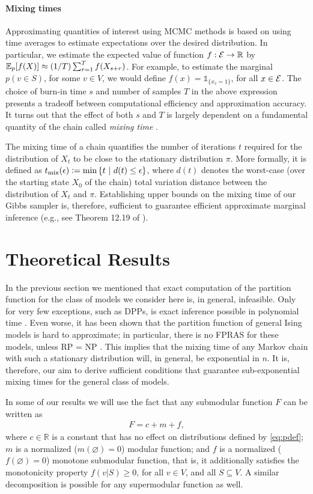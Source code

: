 \paragraph{Mixing times}
Approximating quantities of interest using MCMC methods is based on using time averages to estimate expectations over the desired distribution.
In particular, we estimate the expected value of function $f : \ss \to \mathbb{R}$ by $\E_p[f(X)] \approx (1/T)\sum_{r=1}^{T} f(X_{s + r})$.
For example, to estimate the marginal $p(v \in S)$, for some $v \in V$, we would define $f(x) = \mathds{1}_{\{x_v = 1\}}$, for all $x \in \ss$.
The choice of burn-in time $s$ and number of samples $T$ in the above expression presents a tradeoff between computational efficiency and approximation accuracy.
It turns out that the effect of both $s$ and $T$ is largely dependent on a fundamental quantity of the chain called \emph{mixing time} \cite{levin08}.

The mixing time of a chain quantifies the number of iterations $t$ required for the distribution of $X_t$ to be close to the stationary distribution $\pi$.
More formally, it is defined as $\tme \defeq \min \sdef{t}{d(t) \leq \epsilon}$, where $d(t)$ denotes the worst-case (over the starting state $X_0$ of the chain) total variation distance between the distribution of $X_t$ and $\pi$.
Establishing upper bounds on the mixing time of our Gibbs sampler is, therefore, sufficient to guarantee efficient approximate marginal inference (e.g., see Theorem 12.19 of \citet{levin08}).

\section{Theoretical Results}
In the previous section we mentioned that exact computation of the partition function for the class of models we consider here is, in general, infeasible.
Only for very few exceptions, such as DPPs, is exact inference possible in polynomial time \cite{kulesza12}.
Even worse, it has been shown that the partition function of general Ising models is hard to approximate; in particular, there is no FPRAS for these models, unless RP = NP \cite{jerrum93}.
This implies that the mixing time of any Markov chain with such a stationary distribution will, in general, be exponential in $n$.
It is, therefore, our aim to derive sufficient conditions that guarantee sub-exponential mixing times for the general class of models.

In some of our results we will use the fact that any submodular function $F$ can be written as
\begin{align} \label{eq:decomp}
  F = c + m + f,
\end{align}
where $c \in \mathbb{R}$ is a constant that has no effect on distributions defined by \eqref{eq:pdef}; $m$ is a normalized ($m(\varnothing) = 0$) modular function; and $f$ is a normalized ($f(\varnothing) = 0$) monotone submodular function, that is, it additionally satisfies the monotonicity property $f(v|S) \geq 0$, for all $v \in V$, and all $S \subseteq V$.
A similar decomposition is possible for any supermodular function as well.


